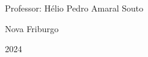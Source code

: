 \begin{titlepage}
    \vspace{1.5cm}

    \begin{flushleft}
        \begin{minipage}{0.5\textwidth}
            \large
            \raggedright
            Professor: Hélio Pedro Amaral Souto
        \end{minipage}
    \end{flushleft}

    \vfill %

    {\large Nova Friburgo \par}
    \vspace{0.3cm}
    {\large 2024 \par}
\end{titlepage}
\newpage %
